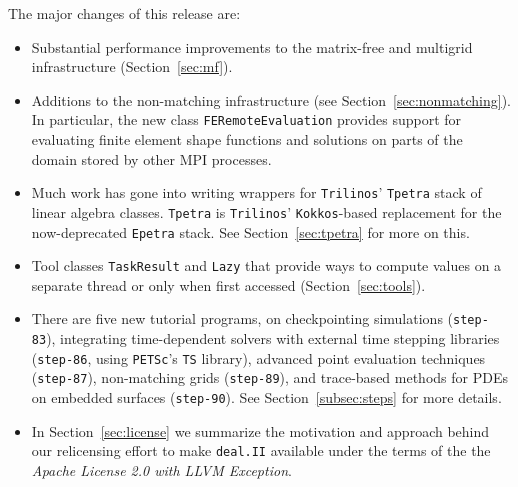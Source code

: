 \documentclass{ansarticle-preprint}
\newcommand{\specialword}[1]{\texttt{#1}}
\newcommand{\dealii}{{\specialword{deal.II}}\xspace}
\newcommand{\trilinos}{{\specialword{Trilinos}}\xspace}
\newcommand{\petsc}{\specialword{PETSc}\xspace}
\newcommand{\ts}{{\specialword{TS}}\xspace}
\newcommand{\kokkos}{{\specialword{Kokkos}}\xspace}
\newcommand{\step}[1]{{\specialword{step-#1}}\xspace}
\newcommand{\epetra}{{\specialword{Epetra}}\xspace}
\newcommand{\tpetra}{{\specialword{Tpetra}}\xspace}
\begin{document}
The major changes of this release are:
%
\begin{itemize}
  \item
    Substantial performance improvements to the matrix-free and multigrid
    infrastructure (Section~\ref{sec:mf}).
  \item
    Additions to the non-matching infrastructure (see
    Section~\ref{sec:nonmatching}). In particular, the new class
    \texttt{FERemoteEvaluation} provides support for evaluating finite
    element shape functions and solutions on parts of the domain stored by
    other MPI processes.
  \item
    Much work has gone into writing wrappers for \trilinos' \tpetra{} stack
    of linear algebra classes. \tpetra{} is \trilinos' \kokkos-based
    replacement for the now-deprecated \epetra{} stack. See
    Section~\ref{sec:tpetra} for more on this.
  \item
    Tool classes \texttt{TaskResult} and \texttt{Lazy} that provide ways to
    compute values on a separate thread or only when first accessed
    (Section~\ref{sec:tools}).
  \item
    There are five new tutorial programs, on checkpointing simulations
    (\step{83}), integrating time-dependent solvers with external time
    stepping libraries (\step{86}, using \petsc's \ts{} library), advanced
    point evaluation techniques (\step{87}), non-matching grids (\step{89}),
    and trace-based methods for PDEs on embedded surfaces (\step{90}). See
    Section~\ref{subsec:steps} for more details.
  \item
    In Section~\ref{sec:license} we summarize the motivation and approach
    behind our relicensing effort to make \dealii available under the terms
    of the the \emph{Apache License 2.0 with LLVM Exception}.
\end{itemize}
%
\end{document}
